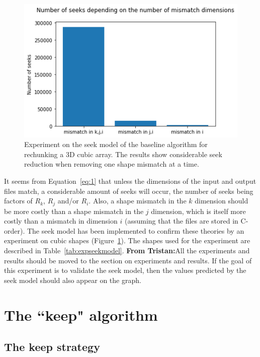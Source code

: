 \documentclass[conference]{IEEEtran}
\newcommand{\tristan}[1]{\color{orange}\textbf{From Tristan:}#1\color{black}}
\begin{document}
\begin{figure}[h]
\centering
\includegraphics[scale=0.55]{./figures/baseline_math_model.png}
\caption{Experiment on the seek model of the baseline algorithm for rechunking a 3D cubic array.
The results show considerable seek reduction when removing one shape mismatch at a time.
}
\label{fig:baseline_math_model}
\end{figure}

It seems from Equation~\ref{eq:1} that unless the dimensions of the input and
output files match, a considerable amount of seeks will occur, the number of
seeks being factors of $R_k$, $R_j$ and/or $R_i$. Also, a shape mismatch in the
$k$ dimension should be more costly than a shape mismatch in the $j$ dimension,
which is itself more costly than a mismatch in dimension $i$ (assuming that the
files are stored in C-order). The seek model has been implemented to confirm
these theories by an experiment on cubic shapes
(Figure~\ref{fig:baseline_math_model}). The shapes used for the experiment are
described in Table~\ref{tab:expseekmodel}. \tristan{All the experiments and results should be moved to the section on experiments and results.
If the goal of this experiment is to validate the seek model, then the values predicted by the seek model should also appear on the graph.}

\section{The ``keep" algorithm}

\subsection{The keep strategy}
\end{document}
